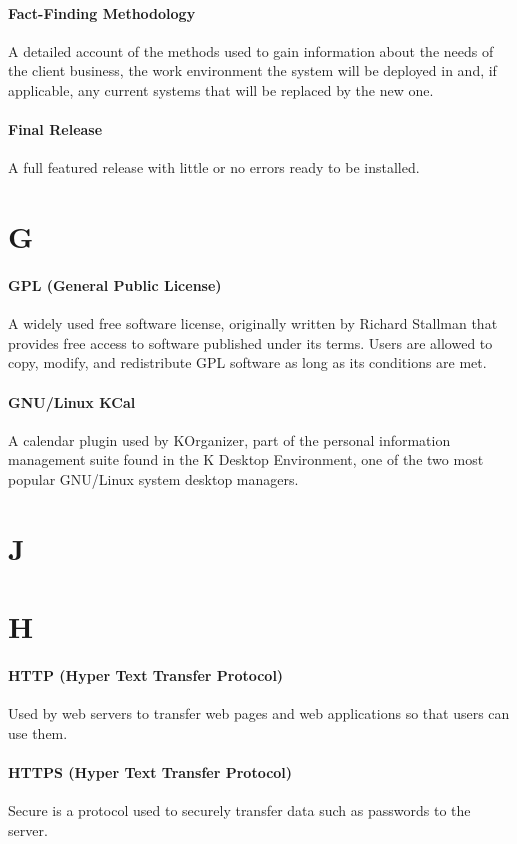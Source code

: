 \documentclass[letterpaper,12pt]{report}
\begin{document}
\paragraph{Fact-Finding Methodology} A detailed account of the methods used to gain information about the needs of the client business, the work environment the system will be deployed in and, if applicable, any current systems that will be replaced by the new one.
\paragraph{Final Release} A full featured release with little or no errors ready to be installed.
\section*{G}
\paragraph{GPL (General Public License)} A widely used free software license, originally written by Richard Stallman that provides free access to software published under its terms. Users are allowed to copy, modify, and redistribute GPL software as long as its conditions are met.
\paragraph{GNU/Linux KCal} A calendar plugin used by KOrganizer, part of the personal information management suite found in the K Desktop Environment, one of the two most popular GNU/Linux system desktop managers.
\section*{J}
\section*{H}
\paragraph{HTTP (Hyper Text Transfer Protocol)} Used by web servers to transfer web pages and web applications so that users can use them.
\paragraph{HTTPS (Hyper Text Transfer Protocol)} Secure is a protocol used to securely transfer data such as passwords to the server. 
\end{document}
